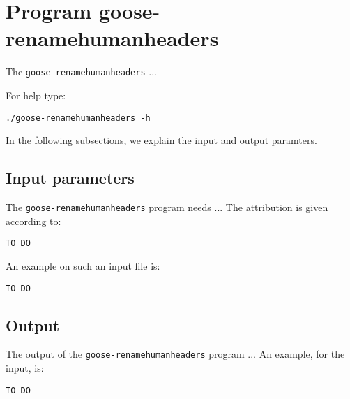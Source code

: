 \section{Program goose-renamehumanheaders}
The \texttt{goose-renamehumanheaders} ...

For help type:
\begin{lstlisting}
./goose-renamehumanheaders -h
\end{lstlisting}
In the following subsections, we explain the input and output paramters.

\subsection{Input parameters}

The \texttt{goose-renamehumanheaders} program needs ...
The attribution is given according to:
\begin{lstlisting}
TO DO
\end{lstlisting}

An example on such an input file is:
\begin{lstlisting}
TO DO
\end{lstlisting}

\subsection{Output}
The output of the \texttt{goose-renamehumanheaders} program ...
An example, for the input, is:
\begin{lstlisting}
TO DO
\end{lstlisting}
